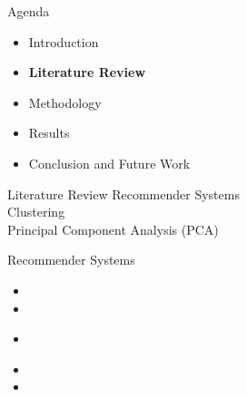 \begin{frame}{Agenda}
\begin{itemize}
    \item Introduction
    \item \textbf{Literature Review}
    \item Methodology
    \item Results
    \item Conclusion and Future Work
\end{itemize}
\end{frame}


\begin{frame}{Literature Review} \pause
    Recommender Systems\\ \pause
    \vspace{0.5cm}
    Clustering\\ \pause
    \vspace{0.5cm}
    Principal Component Analysis (PCA)
\end{frame}


\begin{frame}{Recommender Systems}
    \begin{itemize}
        \item {} 
        \item {} 
    \end{itemize}
        \begin{itemize}
            \item {}
        \end{itemize}
    \vspace{0.5cm}
        \begin{itemize}
            \item {}
            \item {}
        \end{itemize}
\end{frame}


